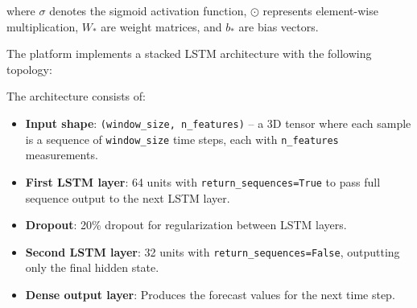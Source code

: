 where $\sigma$ denotes the sigmoid activation function, $\odot$ represents element-wise multiplication, $W_*$ are weight matrices, and $b_*$ are bias vectors.

The platform implements a stacked LSTM architecture with the following topology:


The architecture consists of:
\begin{itemize}
    \item \textbf{Input shape}: \texttt{(window\_size, n\_features)} -- a 3D tensor where each sample is a sequence of \texttt{window\_size} time steps, each with \texttt{n\_features} measurements.
    \item \textbf{First LSTM layer}: 64 units with \texttt{return\_sequences=True} to pass full sequence output to the next LSTM layer.
    \item \textbf{Dropout}: 20\% dropout for regularization between LSTM layers.
    \item \textbf{Second LSTM layer}: 32 units with \texttt{return\_sequences=False}, outputting only the final hidden state.
    \item \textbf{Dense output layer}: Produces the forecast values for the next time step.
\end{itemize}

